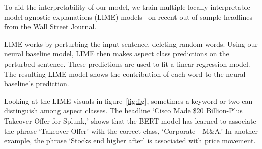 To aid the interpretability of our model, we train multiple locally interpretable model-agnostic explanations (LIME) models~\citep{lime2016} on recent out-of-sample headlines from the Wall Street Journal.

LIME works by perturbing the input sentence, deleting random words.
Using our neural baseline model, LIME then makes aspect class predictions on the perturbed sentence.
These predictions are used to fit a linear regression model.
The resulting LIME model shows the contribution of each word to the neural baseline’s prediction.

Looking at the LIME visuals in figure~\ref{fig:fig}, sometimes a keyword or two can distinguish among aspect classes.
The headline `Cisco Made \$20 Billion-Plus Takeover Offer for Splunk,' shows that the BERT model has learned to associate the phrase `Takeover Offer' with the correct class, `Corporate - M\&A.'
In another example, the phrase `Stocks end higher after' is associated with price movement.
